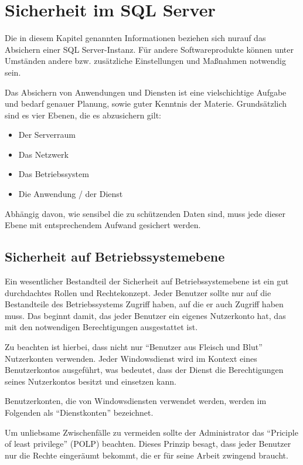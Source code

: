   \chapter{Sicherheit im SQL Server}
    \setcounter{page}{1}
    \minitoc
\newpage
  
    \begin{merke}
      Die in diesem Kapitel genannten Informationen beziehen sich nurauf das
      Absichern einer SQL Server-Instanz. Für andere Softwareprodukte können
      unter Umständen andere bzw. zusätzliche Einstellungen und Maßnahmen
      notwendig sein.
    \end{merke}
    Das Absichern von Anwendungen und Diensten ist eine vielschichtige Aufgabe
    und bedarf genauer Planung, sowie guter Kenntnis der Materie. Grundsätzlich
    sind es vier Ebenen, die es abzusichern gilt:
    \begin{itemize}
        \item Der Serverraum
        \item Das Netzwerk
        \item Das Betriebssystem
        \item Die Anwendung / der Dienst
    \end{itemize}
    Abhängig davon, wie sensibel die zu schützenden Daten sind, muss jede
    dieser Ebene mit entsprechendem Aufwand gesichert werden.
    \section{Sicherheit auf Betriebssystemebene}
      Ein wesentlicher Bestandteil der Sicherheit auf Betriebssystemebene ist
      ein gut durchdachtes Rollen und Rechtekonzept. Jeder Benutzer sollte nur
      auf die Bestandteile des Betriebssystems Zugriff haben, auf die er auch
      Zugriff haben muss. Das beginnt damit, das jeder Benutzer ein eigenes
      Nutzerkonto hat, das mit den notwendigen Berechtigungen ausgestattet ist.
      
      Zu beachten ist hierbei, dass nicht nur \enquote{Benutzer aus Fleisch und
      Blut} Nutzerkonten verwenden. Jeder Windowsdienst wird im Kontext eines
      Benutzerkontos ausgeführt, was bedeutet, dass der Dienst die
      Berechtigungen seines Nutzerkontos besitzt und einsetzen kann.
      \begin{merke}
        Benutzerkonten, die von Windowsdiensten verwendet werden, werden im
        Folgenden als \enquote{Dienstkonten} bezeichnet.
      \end{merke}
      Um unliebsame Zwischenfälle zu vermeiden sollte der Administrator das
      \enquote{Priciple of least privilege} (POLP) beachten. Dieses Prinzip
      besagt, dass jeder Benutzer nur die Rechte eingeräumt bekommt, die er für
      seine Arbeit zwingend braucht.
